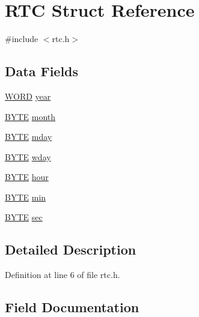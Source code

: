 \hypertarget{structRTC}{}\section{R\+TC Struct Reference}
\label{structRTC}


{\ttfamily \#include $<$rtc.\+h$>$}

\subsection*{Data Fields}
\begin{DoxyCompactItemize}
\item 
\hyperlink{integer_8h_a197942eefa7db30960ae396d68339b97}{W\+O\+RD} \hyperlink{structRTC_acb5071073b17bef18e2e0c0cf10900e1}{year}
\item 
\hyperlink{lz4_8c_a4ae1dab0fb4b072a66584546209e7d58}{B\+Y\+TE} \hyperlink{structRTC_ac2bd3ef00f0fa3600b729702d3a4df96}{month}
\item 
\hyperlink{lz4_8c_a4ae1dab0fb4b072a66584546209e7d58}{B\+Y\+TE} \hyperlink{structRTC_acc4fbd65d30d36768b338a734a1f90a7}{mday}
\item 
\hyperlink{lz4_8c_a4ae1dab0fb4b072a66584546209e7d58}{B\+Y\+TE} \hyperlink{structRTC_ae5f840070c223cdc4c1d5279934bae1a}{wday}
\item 
\hyperlink{lz4_8c_a4ae1dab0fb4b072a66584546209e7d58}{B\+Y\+TE} \hyperlink{structRTC_a8116dd5108afa42843c41510b68dcab6}{hour}
\item 
\hyperlink{lz4_8c_a4ae1dab0fb4b072a66584546209e7d58}{B\+Y\+TE} \hyperlink{structRTC_a6a57a49351a0cdb606bb74d2930496ec}{min}
\item 
\hyperlink{lz4_8c_a4ae1dab0fb4b072a66584546209e7d58}{B\+Y\+TE} \hyperlink{structRTC_a4e9dca93b2215d13696ea8c92755c05a}{sec}
\end{DoxyCompactItemize}


\subsection{Detailed Description}


Definition at line 6 of file rtc.\+h.



\subsection{Field Documentation}
\mbox{\label{structRTC_a8116dd5108afa42843c41510b68dcab6}} 
